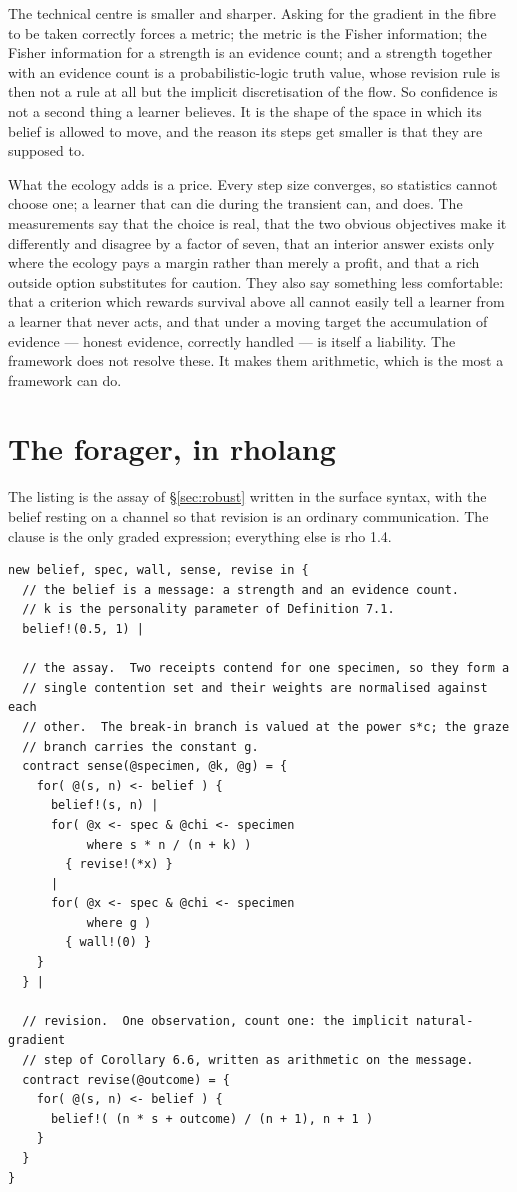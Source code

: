 \documentclass[11pt,a4paper]{article}
\theoremstyle{plain}
\theoremstyle{definition}
\theoremstyle{remark}
\newcommand{\rhoc}{\textsf{rho}}
\begin{document}
The technical centre is smaller and sharper. Asking for the gradient in the fibre
to be taken correctly forces a metric; the metric is the Fisher information; the
Fisher information for a strength is an evidence count; and a strength together
with an evidence count is a probabilistic-logic truth value, whose revision rule
is then not a rule at all but the implicit discretisation of the flow. So
confidence is not a second thing a learner believes. It is the shape of the space
in which its belief is allowed to move, and the reason its steps get smaller is
that they are supposed to.

What the ecology adds is a price. Every step size converges, so statistics cannot
choose one; a learner that can die during the transient can, and does. The
measurements say that the choice is real, that the two obvious objectives make it
differently and disagree by a factor of seven, that an interior answer exists only
where the ecology pays a margin rather than merely a profit, and that a rich
outside option substitutes for caution. They also say something less comfortable:
that a criterion which rewards survival above all cannot easily tell a learner
from a learner that never acts, and that under a moving target the accumulation of
evidence --- honest evidence, correctly handled --- is itself a liability. The
framework does not resolve these. It makes them arithmetic, which is the most a
framework can do.

\appendix

\section{The forager, in rholang}\label{app:rholang}

The listing is the assay of \S\ref{sec:robust} written in the surface syntax, with
the belief resting on a channel so that revision is an ordinary communication.
The clause is the only graded expression; everything else is \rhoc{} 1.4.

\begin{lstlisting}
new belief, spec, wall, sense, revise in {
  // the belief is a message: a strength and an evidence count.
  // k is the personality parameter of Definition 7.1.
  belief!(0.5, 1) |

  // the assay.  Two receipts contend for one specimen, so they form a
  // single contention set and their weights are normalised against each
  // other.  The break-in branch is valued at the power s*c; the graze
  // branch carries the constant g.
  contract sense(@specimen, @k, @g) = {
    for( @(s, n) <- belief ) {
      belief!(s, n) |
      for( @x <- spec & @chi <- specimen
           where s * n / (n + k) )
        { revise!(*x) }
      |
      for( @x <- spec & @chi <- specimen
           where g )
        { wall!(0) }
    }
  } |

  // revision.  One observation, count one: the implicit natural-gradient
  // step of Corollary 6.6, written as arithmetic on the message.
  contract revise(@outcome) = {
    for( @(s, n) <- belief ) {
      belief!( (n * s + outcome) / (n + 1), n + 1 )
    }
  }
}
\end{lstlisting}
\end{document}
